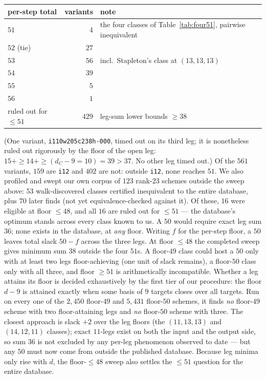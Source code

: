 \documentclass[11pt]{article}
\theoremstyle{definition}
\theoremstyle{remark}
\begin{document}
\begin{center}
\begin{tabular}{lrl}
\toprule
per-step total & variants & note\\
\midrule
$51$ & $4$ & the four classes of Table~\ref{tab:four51}, pairwise inequivalent\\
$52$ (tie) & $27$ & \\
$53$ & $56$ & incl.\ Stapleton's class at $(13,13,13)$\\
$54$ & $39$ & \\
$55$ & $5$ & \\
$56$ & $1$ & \\
ruled out for $\le51$ & $429$ & leg-sum lower bounds $\ge38$\\
\bottomrule
\end{tabular}
\end{center}

\noindent
(One variant, \texttt{i110w205c238h-000}, timed out on its third leg;
it is nonetheless ruled out rigorously by the floor of the open leg:
$15 + {\ge}14 + {\ge}(d_C-9{=}10) = 39 > 37$.  No other leg timed
out.)  Of the $561$ variants, $159$ are \texttt{i12} and $402$ are
not: outside \texttt{i12}, none reaches $51$.
We also profiled and swept our own corpus of $123$ rank-23 schemes
outside the sweep above: $53$ walk-discovered classes certified
inequivalent to the entire database, plus $70$ later finds (not yet
equivalence-checked against it).  Of these, $16$ were eligible at
floor $\le48$, and all $16$ are ruled out for $\le51$ --- the
database's optimum stands across every class known to us.
A $50$ would require exact leg sum $36$; none exists in the database,
at \emph{any} floor.  Writing $f$ for the per-step floor, a $50$
leaves total slack $50-f$ across the three legs.  At floor $\le48$
the completed sweep gives minimum sum $38$ outside the four $51$s.  A
floor-$49$ class could host a $50$ only with at least two legs
floor-achieving (one unit of slack remains), a floor-$50$ class only
with all three, and floor $\ge51$ is arithmetically incompatible.
Whether a leg attains its floor is decided exhaustively by the first
tier of our procedure: the floor $d-9$ is attained exactly when some
basis of $9$ targets closes over all targets.  Run on every one of
the $2{,}450$ floor-$49$ and $5{,}431$ floor-$50$ schemes, it finds
\emph{no} floor-$49$ scheme with two floor-attaining legs and
\emph{no} floor-$50$ scheme with three.  The closest approach
is slack $+2$ over the leg floors (the $(11,13,13)$ and $(14,12,11)$
classes); exact $11$-legs exist on both the input and the output
side, so sum $36$ is not excluded by any per-leg phenomenon observed
to date --- but any $50$ must now come from outside the published
database.  Because leg minima only rise with $d$, the
floor-$\le48$ sweep also settles the $\le51$ question for the entire
database.
\end{document}
